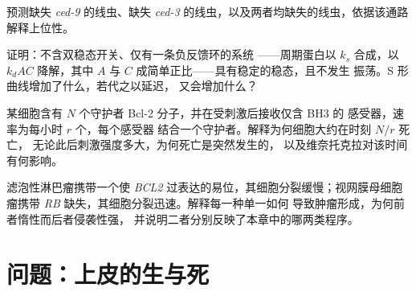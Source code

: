 \begin{exercise}[$\star\star$]\label{exo:b3:cell-cycle-apoptosis:9}
预测缺失 \emph{ced-9} 的线虫、缺失
\emph{ced-3} 的线虫，以及两者均缺失的线虫，依据该通路
解释上位性。
\end{exercise}

\begin{exercise}[$\star\star\star$]\label{exo:b3:cell-cycle-apoptosis:10}
证明：不含双稳态开关、仅有一条负反馈环的系统
——周期蛋白以 $k_{s}$ 合成，以 $k_{d}AC$ 降解，其中 $A$
与 $C$ 成简单正比——具有稳定的稳态，且不发生
振荡。S 形曲线增加了什么，若代之以延迟，
又会增加什么？
\end{exercise}

\begin{exercise}[$\star\star\star$]\label{exo:b3:cell-cycle-apoptosis:11}
某细胞含有 $N$ 个守护者 Bcl-2 分子，并在受刺激后接收仅含 BH3 的
感受器，速率为每小时 $r$ 个，每个感受器
结合一个守护者。解释为何细胞大约在时刻 $N/r$ 死亡，
无论此后刺激强度多大，为何死亡是突然发生的，
以及维奈托克拉对该时间有何影响。
\end{exercise}

\begin{exercise}[$\star\star\star$]\label{exo:b3:cell-cycle-apoptosis:12}
滤泡性淋巴瘤携带一个使
\emph{BCL2} 过表达的易位，其细胞分裂缓慢；视网膜母细胞瘤携带
\emph{RB} 缺失，其细胞分裂迅速。解释每一种单一如何
导致肿瘤形成，为何前者惰性而后者侵袭性强，
并说明二者分别反映了本章中的哪两类程序。
\end{exercise}

\section{问题：上皮的生与死}

